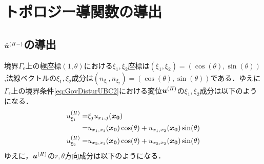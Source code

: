 \documentclass[titlepage,a4paper,12pt,oneside,dvipdfmx]{jsbook}
\begin{document}
\chapter{トポロジー導関数の導出}




%



\section{$\hat{\bm{u}}^{(I\hspace{-.15em}I-)}$の導出}

境界$\Gamma_{\epsilon}$上の極座標$(1,\theta)$における$\xi_1,\xi_2$座標は$(\xi_1,\xi_2)=(\cos(\theta),\sin(\theta))$,法線ベクトルの$\xi_1,\xi_2$成分は$(n_{\xi_1},n_{\xi_2})=(\cos(\theta),\sin(\theta))$である．ゆえに$\Gamma_\epsilon$上の境界条件\eqref{eq:GovDisturUBC2}における変位$\bm{u}^{(I\hspace{-.15em}I)}$の$\xi_1,\xi_2$成分は以下のようになる．
\begin{align}
	u_{\xi_1}^{(I\hspace{-.15em}I)}=&\xi_{j} u_{x_{1},j}(\bm{x_{0}})
	\nonumber
	\\
	=&u_{x_{1},x_{1}}(\bm{x_{0}})\cos(\theta)+u_{x_{1},x_{2}}(\bm{x_{0}})\sin(\theta)
	\\
	u_{\xi_2}^{(I\hspace{-.15em}I)}=
	&u_{x_{2},x_{1}}(\bm{x_{0}})\cos(\theta)+u_{x_{2},x_{2}}(\bm{x_{0}})\sin(\theta)
\end{align}
ゆえに，$\bm{u}^{(I\hspace{-.15em}I)}$の$r,\theta$方向成分は以下のようになる．
\end{document}
